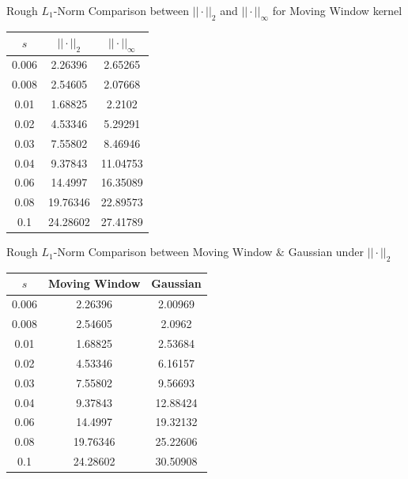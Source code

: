 \documentclass{article}
\begin{document}
\begin{multicols}{2}


\begin{center}

Rough $L_1$-Norm Comparison  between $||\cdot ||_2$ and  $||\cdot ||_{\infty}$ for Moving Window kernel \vspace*{1em} \\
\begin{tabular}{ccc}

\hline  

$s$  &$||\cdot||_2$              &$||\cdot||_{\infty}$   \\
\hline  

0.006      &2.26396      &2.65265\\
0.008	    &2.54605   &2.07668 \\
0.01	    &1.68825   &2.2102 \\
0.02	    &4.53346   &5.29291 \\
0.03	    &7.55802   &8.46946 \\
0.04	    &9.37843   &11.04753 \\
0.06	    &14.4997   &16.35089 \\
0.08	    &19.76346   &22.89573 \\
0.1	    &24.28602   &27.41789 \\

\hline 
\end{tabular}
\end{center}


\begin{center}
Rough $L_1$-Norm Comparison  between Moving Window $\&$ Gaussian under $||\cdot||_2$ \vspace*{1em} \\
\begin{tabular}{ccc}

\hline  

$s$  &Moving Window              &Gaussian   \\
\hline  

0.006      &2.26396   &2.00969\\
0.008	    &2.54605   &2.0962 \\
0.01	    &1.68825   &2.53684 \\
0.02	    &4.53346   &6.16157 \\
0.03	    &7.55802   &9.56693 \\
0.04	    &9.37843   &12.88424 \\
0.06	    &14.4997   &19.32132 \\
0.08	    &19.76346   &25.22606 \\
0.1	    &24.28602   &30.50908 \\

\hline 
\end{tabular}

\end{center}

\end{multicols}
\end{document}
